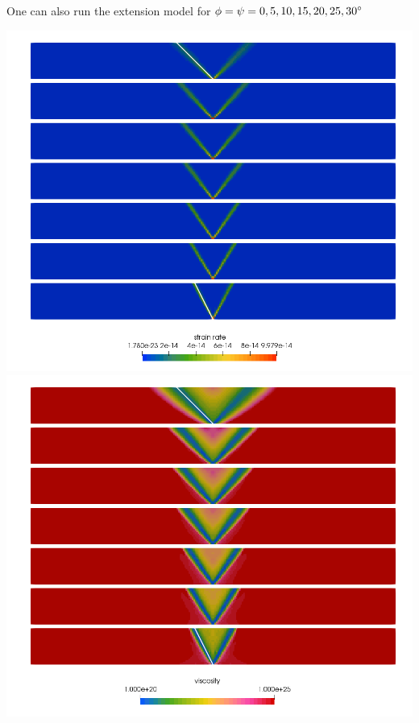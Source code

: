 One can also run the extension model for $\phi=\psi={0,5,10,15,20,25,30}\degree$
\begin{center}
\includegraphics[width=.5\linewidth]{python_codes/fieldstone_39/images/sr_0_30}
\includegraphics[width=.5\linewidth]{python_codes/fieldstone_39/images/etaeff_0_30}\\
\end{center}

